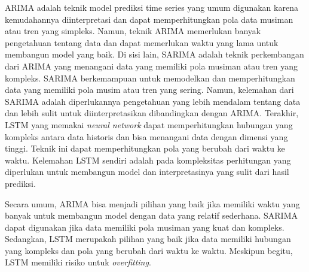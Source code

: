 ARIMA adalah teknik model prediksi time series yang umum digunakan karena kemudahannya diinterpretasi dan dapat memperhitungkan pola data musiman atau tren yang simpleks. Namun, teknik ARIMA memerlukan banyak pengetahuan tentang data dan dapat memerlukan waktu yang lama untuk membangun model yang baik. Di sisi lain, SARIMA adalah teknik perkembangan dari ARIMA yang menangani data yang memiliki pola musiman atau tren yang kompleks. SARIMA berkemampuan untuk memodelkan dan memperhitungkan data yang memiliki pola musim atau tren yang sering. Namun, kelemahan dari SARIMA adalah diperlukannya pengetahuan yang lebih mendalam tentang data dan lebih sulit untuk diinterpretasikan dibandingkan dengan ARIMA. Terakhir, LSTM yang memakai \textit{neural network} dapat memperhitungkan hubungan yang kompleks antara data historis dan bisa menangani data dengan dimensi yang tinggi. Teknik ini dapat memperhitungkan pola yang berubah dari waktu ke waktu. Kelemahan LSTM sendiri adalah pada kompleksitas perhitungan yang diperlukan untuk membangun model dan interpretasinya yang sulit dari hasil prediksi.

Secara umum, ARIMA bisa menjadi pilihan yang baik jika memiliki waktu yang banyak untuk membangun model dengan data yang relatif sederhana. SARIMA dapat digunakan jika data memiliki pola musiman yang kuat dan kompleks. Sedangkan, LSTM merupakah pilihan yang baik jika data memiliki hubungan yang kompleks dan pola yang berubah dari waktu ke waktu. Meskipun begitu, LSTM memiliki risiko untuk \textit{overfitting}.